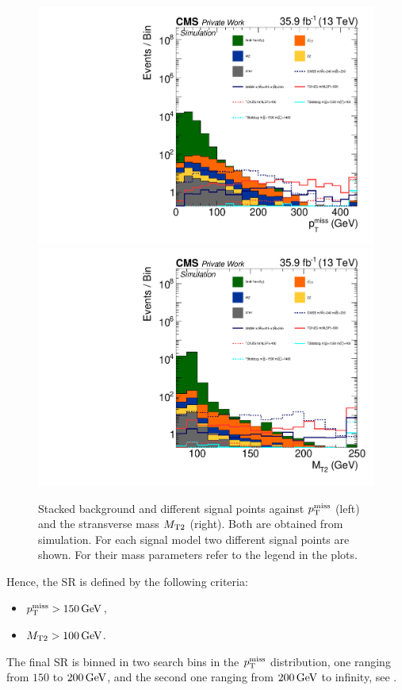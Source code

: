\begin{figure}[tbp]
 \centering
 \includegraphics[width=\pairwidth]{figures/plots/onZ_LL_met_log}
 \includegraphics[width=\pairwidth]{figures/plots/onZ_LL_mt2_log}
 \caption{Stacked background and different signal points against $p_{\mathrm{T}}^\text{miss}$ (left) and the stransverse mass $M_{\mathrm{T2}}$ (right). Both are obtained from simulation. For each signal model two different signal points are shown. For their mass parameters refer to the legend in the plots.}
 \label{fig:SRvariables}
\end{figure}
Hence, the SR is defined by the following criteria:
\begin{itemize}
 \item $p_{\mathrm{T}}^\text{miss}>150\,\text{Ge\hspace{-.08em}V}$,
 \item $M_{\mathrm{T2}}>100\,\text{Ge\hspace{-.08em}V}$.
\end{itemize}
The final SR is binned in two search bins in the $p_{\mathrm{T}}^\text{miss}$ distribution, one ranging from $150$ to $200\,\text{Ge\hspace{-.08em}V}$, and the second one ranging from $200\,\text{Ge\hspace{-.08em}V}$ to infinity, see .

